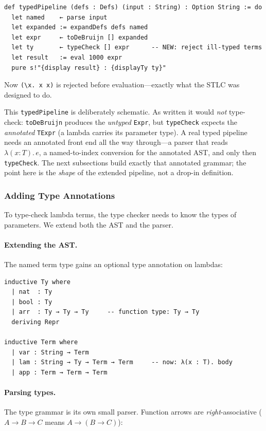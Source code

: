 \documentclass[11pt,a4paper]{article}
\theoremstyle{definition}
\newcommand{\lam}{\lambda}
\begin{document}
\begin{verbatim}
def typedPipeline (defs : Defs) (input : String) : Option String := do
  let named    ← parse input
  let expanded := expandDefs defs named
  let expr     ← toDeBruijn [] expanded
  let ty       ← typeCheck [] expr      -- NEW: reject ill-typed terms
  let result   := eval 1000 expr
  pure s!"{display result} : {displayTy ty}"
\end{verbatim}

Now \texttt{(\textbackslash x. x x)} is rejected before evaluation---exactly
what the STLC was designed to do.

\begin{warning}
This \texttt{typedPipeline} is deliberately schematic. As written it would
\emph{not} type-check: \texttt{toDeBruijn} produces the \emph{untyped}
\texttt{Expr}, but \texttt{typeCheck} expects the \emph{annotated}
\texttt{TExpr} (a lambda carries its parameter type). A real typed pipeline
needs an annotated front end all the way through---a parser that reads
$\lam(x{:}T).\,e$, a named-to-index conversion for the annotated AST, and only
then \texttt{typeCheck}. The next subsections build exactly that annotated
grammar; the point here is the \emph{shape} of the extended pipeline, not a
drop-in definition.
\end{warning}

\subsubsection{Adding Type Annotations}

To type-check lambda terms, the type checker needs to know the types of
parameters. We extend both the AST and the parser.

\paragraph{Extending the AST.}
The named term type gains an optional type annotation on lambdas:

\begin{verbatim}
inductive Ty where
  | nat  : Ty
  | bool : Ty
  | arr  : Ty → Ty → Ty     -- function type: Ty → Ty
  deriving Repr

inductive Term where
  | var : String → Term
  | lam : String → Ty → Term → Term     -- now: λ(x : T). body
  | app : Term → Term → Term
\end{verbatim}

\paragraph{Parsing types.}
The type grammar is its own small parser. Function arrows are
\emph{right}-associative ($A \to B \to C$ means $A \to (B \to C)$):
\end{document}
